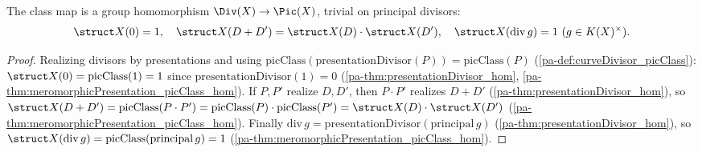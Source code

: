 \begin{theorem}
  \label{pa-thm:curveDivisor_picClass_hom}
  \leanok

  The class map is a group homomorphism \(\Div(X) \to \Pic(X)\), trivial on principal divisors:
  \[
    \struct X(0) = 1, \quad \struct X(D + D') = \struct X(D) \cdot \struct X(D'), \quad \struct
    X(\mathrm{div}\, g) = 1 \ (g \in K(X)^{\times}).
  \]
\end{theorem}
\begin{proof}
  \leanok
  Realizing divisors by presentations and using
  \(\mathrm{picClass}(\mathrm{presentationDivisor}(P)) = \mathrm{picClass}(P)\)
  (\ref{pa-def:curveDivisor_picClass}): \(\struct X(0) = \mathrm{picClass}(1) = 1\) since
  \(\mathrm{presentationDivisor}(1) = 0\) (\ref{pa-thm:presentationDivisor_hom},
  \ref{pa-thm:meromorphicPresentation_picClass_hom}). If \(P, P'\) realize \(D, D'\), then \(P \cdot
  P'\) realizes \(D + D'\) (\ref{pa-thm:presentationDivisor_hom}), so \(\struct X(D + D') =
  \mathrm{picClass}(P \cdot P') = \mathrm{picClass}(P) \cdot \mathrm{picClass}(P') = \struct X(D)
  \cdot \struct X(D')\) (\ref{pa-thm:meromorphicPresentation_picClass_hom}). Finally
  \(\mathrm{div}\, g = \mathrm{presentationDivisor}(\mathrm{principal}\, g)\)
  (\ref{pa-thm:presentationDivisor_hom}), so \(\struct X(\mathrm{div}\, g) =
  \mathrm{picClass}(\mathrm{principal}\, g) = 1\) (\ref{pa-thm:meromorphicPresentation_picClass_hom}).
\end{proof}


